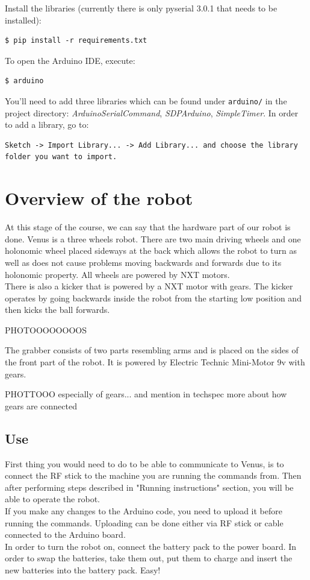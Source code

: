\documentclass[12pt]{article}
\begin{document}
Install the libraries (currently there is only pyserial 3.0.1 that needs to be installed):
\begin{lstlisting}
$ pip install -r requirements.txt
\end{lstlisting}

To open the Arduino IDE, execute:
\begin{lstlisting}
$ arduino
\end{lstlisting}

You'll need to add three libraries which can be found under \texttt{arduino/} in the project directory: \textit{ArduinoSerialCommand}, \textit{SDPArduino}, \textit{SimpleTimer}. In order to add a library, go to:
\begin{lstlisting}
Sketch -> Import Library... -> Add Library... and choose the library folder you want to import.
\end{lstlisting}

\section{Overview of the robot}

At this stage of the course, we can say that the hardware part of our robot is done. Venus is a three wheels robot. There are two main driving wheels and one holonomic wheel placed sideways at the back which allows the robot to turn as well as does not cause problems moving backwards and forwards due to its holonomic property. All wheels are powered by NXT motors. 
\\There is also a kicker that is powered by a NXT motor with gears. The kicker operates by going backwards inside the robot from the starting low position and then kicks the ball forwards.


\bigskip
PHOTOOOOOOOOS

The grabber consists of two parts resembling arms and is placed on the sides of the front part of the robot. It is powered by Electric Technic Mini-Motor 9v with gears. 

\bigskip
PHOTTOOO especially of gears... and mention in techspec more about how gears are connected

\subsection{Use}

First thing you would need to do to be able to communicate to Venus, is to connect the RF stick to the machine you are running the commands from. Then after performing steps described in "Running instructions" section, you will be able to operate the robot.
\\If you make any changes to the Arduino code, you need to upload it before running the commands. Uploading can be done either via RF stick or cable connected to the Arduino board. 
\\In order to turn the robot on, connect the battery pack to the power board.
In order to swap the batteries, take them out, put them to charge and insert
the new batteries into the battery pack. Easy!
\end{document}
